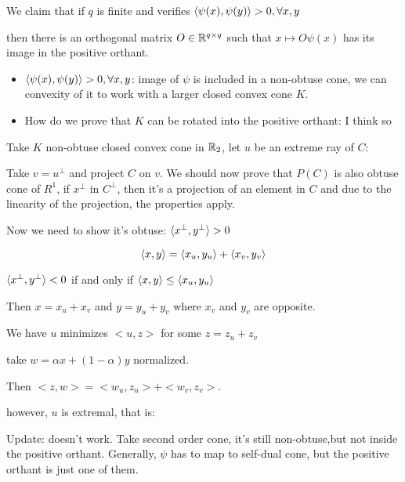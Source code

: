 \documentclass[aspectratio=169]{beamer}
\begin{document}
\begin{frame}

	We claim that if $q$ is finite and verifies $\langle\psi(x), \psi(y)\rangle>0,
	\forall x,y$

	then there is an orthogonal matrix $O\in\mathbb{R}^{q\times q}$ such that $x\mapsto
	O\psi(x)$ has its image in the positive orthant.

	\begin{itemize}
		\item $\langle\psi(x), \psi(y)\rangle>0, \forall x,y$: image of $\psi$ is included
		      in a non-obtuse cone, we can convexity of it to work with a larger closed
		      convex cone $K$.
		\item How do we prove that $K$ can be rotated into the positive orthant: I
		      think so
	\end{itemize}
\end{frame}

\begin{frame}
	Take $K$ non-obtuse closed convex cone in $\mathbb{R}_2$, let $u$ be an extreme ray of $C$:

	Take $v=u^\perp$ and project $C$ on $v$. We should now prove that $P(C)$ is
	also obtuse cone of $R^1$, if $x^\perp$ in $C^\perp$, then it's a projection of
	an element in $C$ and due to the linearity of the projection, the properties
	apply.

	Now we need to show it's obtuse: $\langle x^\perp,y^\perp\rangle >0$

	$$
		\langle x,y\rangle =\langle x_u,y_u\rangle +  \langle x_v,y_v\rangle
	$$

	$\langle x^\perp,y^\perp\rangle < 0$ if and only if $\langle x,y\rangle\leq\langle x_u,y_u\rangle$

	Then $x= x_u + x_v$ and $y = y_u + y_v$ where $x_v$ and $y_v$ are opposite.

	We have $u$ minimizes $<u,z>$ for some $z =z_u + z_v$

	take $w = \alpha x + (1-\alpha)y$ normalized.

	Then $<z, w> =<w_u,z_u> +<w_v,z_v>$.

	however, $u$ is extremal, that is:

	Update: doesn't work. Take second order cone, it's still non-obtuse,but not
	inside the positive orthant. Generally, $\psi$ has to map to self-dual cone,
	but the positive orthant is just one of them.

\end{frame}
\end{document}
